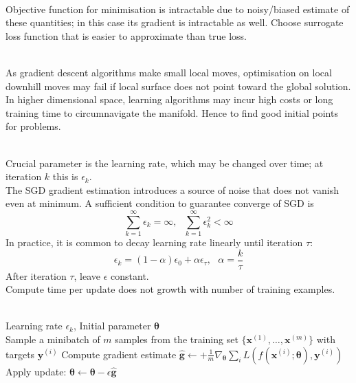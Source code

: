 \begin{remark} \\
Objective function for minimisation is intractable due to noisy/biased estimate of these quantities; in this case its gradient is intractable as well. Choose surrogate loss function that is easier to approximate than true loss.
\end{remark}

\begin{remark} \\
As gradient descent algorithms make small local moves, optimisation on local downhill moves may fail if local surface does not point toward the global solution. In higher dimensional space, learning algorithms may incur high costs or long training time to circumnavigate the manifold. Hence to find good initial points for problems.
\end{remark}

\begin{remark} \\
Crucial parameter is the learning rate, which may be changed over time; at iteration $k$ this is $\epsilon_k$.\\
The SGD gradient estimation introduces a source of noise that does not vanish even at minimum. A sufficient condition to guarantee converge of SGD is
\begin{equation*}
\sum\limits_{k=1}^{\infty} \epsilon_k = \infty, \ \ \ \sum\limits_{k=1}^{\infty} \epsilon_k^2 < \infty \nonumber
\end{equation*}
In practice, it is common to decay learning rate linearly until iteration $\tau$:
\begin{equation*}
\epsilon_k = (1- \alpha)\epsilon_0 + \alpha \epsilon_{\tau}, \ \ \ \alpha = \frac{k}{\tau} \nonumber
\end{equation*}
After iteration $\tau$, leave $\epsilon$ constant.\\
Compute time per update does not growth with number of training examples.
\end{remark}

\begin{breakablealgorithm}
\caption{Stochastic Gradient Descent (SGD) Update at Training Iteration $k$}
\begin{algorithmic}
\Require \\
Learning rate $\epsilon_k$, Initial parameter $\bm{\theta}$\\

\State Sample a minibatch of $m$ samples from the training set $\{\bm{x}^{(1)}, \ldots, \bm{x}^{(m)} \}$ with targets $\bm{y}^{(i)}$
\State Compute gradient estimate $\hat{\bm{g}} \leftarrow + \frac{1}{m} \nabla_{\bm{\theta}} \sum_{i} L(f(\bm{x}^{(i)}; \bm{\theta}), \bm{y}^{(i)})$
\State Apply update: $\bm{\theta} \leftarrow \bm{\theta} - \epsilon \hat{\bm{g}}$
\EndWhile
\end{algorithmic}
\end{breakablealgorithm}

